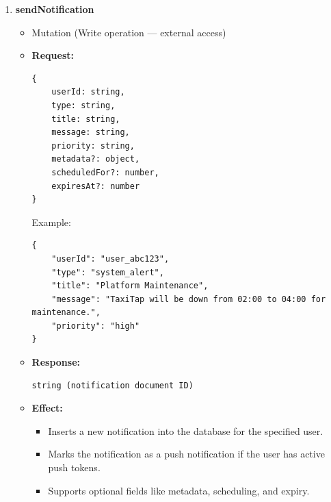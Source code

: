 \documentclass[a4paper,12pt]{article}
\begin{document}
\begin{enumerate}
    \item \textbf{sendNotification}
    \begin{itemize}
        \item Mutation (Write operation — external access)
        \item \textbf{Request:}
        \begin{verbatim}
{
    userId: string,
    type: string,
    title: string,
    message: string,
    priority: string,
    metadata?: object,
    scheduledFor?: number,
    expiresAt?: number
}
        \end{verbatim}
        Example:
        \begin{verbatim}
{
    "userId": "user_abc123",
    "type": "system_alert",
    "title": "Platform Maintenance",
    "message": "TaxiTap will be down from 02:00 to 04:00 for maintenance.",
    "priority": "high"
}
        \end{verbatim}
        \item \textbf{Response:}
        \begin{verbatim}
string (notification document ID)
        \end{verbatim}
        \item \textbf{Effect:}
        \begin{itemize}
            \item Inserts a new notification into the database for the specified user.
            \item Marks the notification as a push notification if the user has active push tokens.
            \item Supports optional fields like metadata, scheduling, and expiry.
        \end{itemize}
    \end{itemize}


\end{enumerate}
\end{document}
